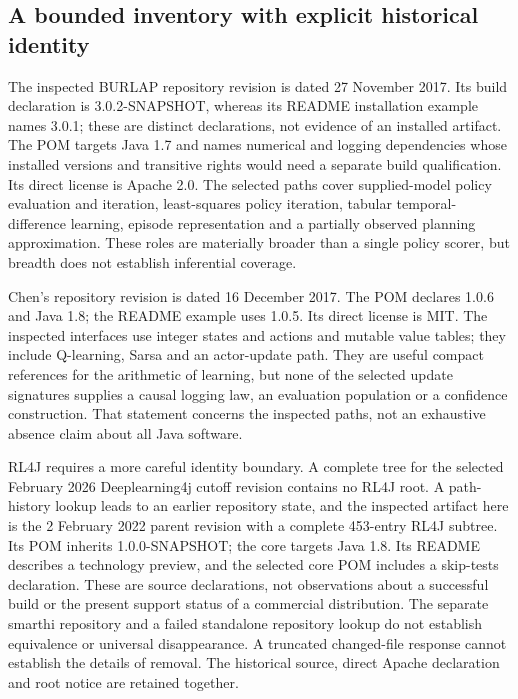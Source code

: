 \subsection{A bounded inventory with explicit historical identity}
The inspected BURLAP repository revision is dated 27 November 2017. Its build declaration is 3.0.2-SNAPSHOT, whereas its README installation example names 3.0.1; these are distinct declarations, not evidence of an installed artifact. The POM targets Java 1.7 and names numerical and logging dependencies whose installed versions and transitive rights would need a separate build qualification. Its direct license is Apache 2.0. The selected paths cover supplied-model policy evaluation and iteration, least-squares policy iteration, tabular temporal-difference learning, episode representation and a partially observed planning approximation. These roles are materially broader than a single policy scorer, but breadth does not establish inferential coverage.~\citep{exec24_policyjava_burlap}

Chen's repository revision is dated 16 December 2017. The POM declares 1.0.6 and Java 1.8; the README example uses 1.0.5. Its direct license is MIT. The inspected interfaces use integer states and actions and mutable value tables; they include Q-learning, Sarsa and an actor-update path. They are useful compact references for the arithmetic of learning, but none of the selected update signatures supplies a causal logging law, an evaluation population or a confidence construction. That statement concerns the inspected paths, not an exhaustive absence claim about all Java software.~\citep{exec24_policyjava_chen}

RL4J requires a more careful identity boundary. A complete tree for the selected February 2026 Deeplearning4j cutoff revision contains no RL4J root. A path-history lookup leads to an earlier repository state, and the inspected artifact here is the 2 February 2022 parent revision with a complete 453-entry RL4J subtree. Its POM inherits 1.0.0-SNAPSHOT; the core targets Java 1.8. Its README describes a technology preview, and the selected core POM includes a skip-tests declaration. These are source declarations, not observations about a successful build or the present support status of a commercial distribution. The separate smarthi repository and a failed standalone repository lookup do not establish equivalence or universal disappearance. A truncated changed-file response cannot establish the details of removal. The historical source, direct Apache declaration and root notice are retained together.~\citep{exec24_policyjava_rl4j,exec24_policyjava_comparison}

